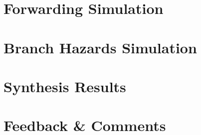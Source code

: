 \documentclass[12pt,a4paper,titlepage,oneside]{article}
\begin{document}
\maketitle

\section*{Forwarding Simulation}

\clearpage
\section*{Branch Hazards Simulation}

\clearpage
\section*{Synthesis Results}

\clearpage
\section*{Feedback \& Comments}

 
\end{document}
